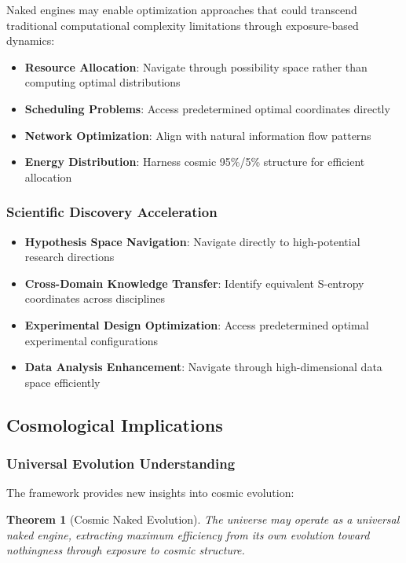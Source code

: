 \documentclass[11pt,a4paper]{article}
\newtheorem{theorem}{Theorem}[section]
\theoremstyle{remark}
\begin{document}
Naked engines may enable optimization approaches that could transcend traditional computational complexity limitations through exposure-based dynamics:

\begin{itemize}
\item \textbf{Resource Allocation}: Navigate through possibility space rather than computing optimal distributions
\item \textbf{Scheduling Problems}: Access predetermined optimal coordinates directly
\item \textbf{Network Optimization}: Align with natural information flow patterns
\item \textbf{Energy Distribution}: Harness cosmic 95\%/5\% structure for efficient allocation
\end{itemize}

\subsubsection{Scientific Discovery Acceleration}

\begin{itemize}
\item \textbf{Hypothesis Space Navigation}: Navigate directly to high-potential research directions
\item \textbf{Cross-Domain Knowledge Transfer}: Identify equivalent S-entropy coordinates across disciplines
\item \textbf{Experimental Design Optimization}: Access predetermined optimal experimental configurations
\item \textbf{Data Analysis Enhancement}: Navigate through high-dimensional data space efficiently
\end{itemize}

\subsection{Cosmological Implications}

\subsubsection{Universal Evolution Understanding}

The framework provides new insights into cosmic evolution:

\begin{theorem}[Cosmic Naked Evolution]
The universe may operate as a universal naked engine, extracting maximum efficiency from its own evolution toward nothingness through exposure to cosmic structure.
\end{theorem}
\end{document}
